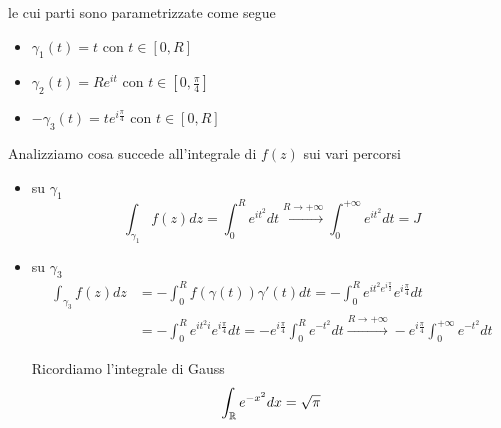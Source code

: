 le cui parti sono parametrizzate come segue
\begin{itemize}
\item $\gamma _{1}\left( t\right) =t$ con $t\in \left[ 0,R\right]$
\item $\gamma _{2}\left( t\right) =Re^{it}$ con $t\in \left[ 0,\frac{\pi }{4}\right]$
\item $-\gamma _{3}\left( t\right) =te^{i\frac{\pi }{4}}$ con $t\in \left[ 0,R\right]$
\end{itemize}

Analizziamo cosa succede all'integrale di $f\left( z\right)$ sui vari percorsi
\begin{itemize}
\item su $\gamma _{1}$\begin{equation*}
\int\nolimits _{\gamma _{1}} f\left( z\right) dz=\int\nolimits ^{R}_{0} e^{it^{2}} dt\xrightarrow{R\rightarrow +\infty }\int\nolimits ^{+\infty }_{0} e^{it^{2}} dt=J
\end{equation*}
\item su $\gamma _{3}$\begin{align*}
\int\nolimits _{\gamma _{3}} f\left( z\right) dz & =-\int\nolimits ^{R}_{0} f\left( \gamma \left( t\right)\right) \gamma '\left( t\right) dt=-\int\nolimits ^{R}_{0} e^{it^{2} e^{i\frac{\pi }{2}}} e^{i\frac{\pi }{4}} dt\\
 & =-\int\nolimits ^{R}_{0} e^{it^{2} i} e^{i\frac{\pi }{4}} dt=-e^{i\frac{\pi }{4}}\int\nolimits ^{R}_{0} e^{-t^{2}} dt\xrightarrow{R\rightarrow +\infty } -e^{i\frac{\pi }{4}}\int\nolimits ^{+\infty }_{0} e^{-t^{2}} dt
\end{align*}

\begin{rem}
Ricordiamo l'integrale di Gauss
\begin{equation*}
\int\nolimits _{\mathbb{R} } e^{-x^{2}} dx=\sqrt{\pi }
\end{equation*}
\end{rem}


\end{itemize}
